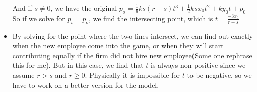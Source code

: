 \documentclass{article}
\newenvironment{atomize}
    {\begin{list} {} {
            \setlength\itemindent{0pt}
            \setlength\leftmargin{10pt}
            \setlength\labelwidth{0pt}
    }}
    {\end{list}}
\begin{document}
\begin{atomize}
\begin{itemize}
And if $s\neq0$, we have the original $p_{o} = \frac{1}{6}ks(r-s)t^{3} + \frac{1}{2}ksx_{0}t^{2} + ky_{0}t + p_{0}$ So if we solve for $p_{i}=p_{o}$, we find the intersecting point, which is $t=\frac{-3x_{0}}{r-s}$

\item By solving for the point where the two lines intersect, we can find out exactly when the new employee come into the game, or when they will start contributing equally if the firm did not hire new employee(Some one rephrase this for me). But in this case, we find that $t$ is always non positive since we assume $r>s$ and $r\geq0$. Physically it is impossible for $t$ to be negative, so we have to work on a better version for the model.
            \end{itemize}
    \end{atomize}
\end{document}
